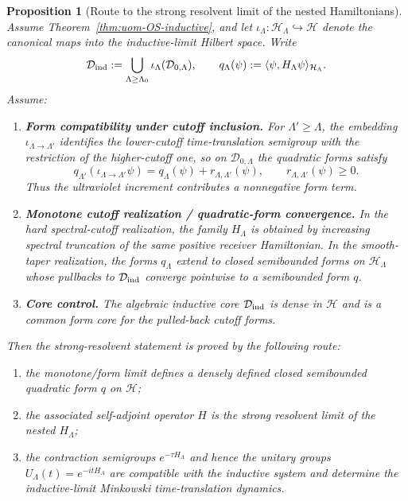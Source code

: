 \documentclass[10pt]{article}
\theoremstyle{definition}
\theoremstyle{plain}
\newtheorem{proposition}{Proposition}[section]
\begin{document}
\begin{proposition}[Route to the strong resolvent limit of the nested Hamiltonians]
\label{prop:uom-H-limit-route}
Assume Theorem~\ref{thm:uom-OS-inductive}, and let
\(
\iota_\Lambda:\mathcal H_\Lambda\hookrightarrow \mathcal H
\)
denote the canonical maps into the inductive-limit Hilbert space.  Write
\[
\mathcal D_{\rm ind}:=\bigcup_{\Lambda\ge\Lambda_0}\iota_\Lambda(\mathcal D_{0,\Lambda}),
\qquad
q_\Lambda(\psi):=\langle \psi,H_\Lambda\psi\rangle_{\mathcal H_\Lambda}.
\]
Assume:
\begin{enumerate}[label=\textnormal{(\roman*)},leftmargin=2.2em,itemsep=1pt]
\item \textbf{Form compatibility under cutoff inclusion.}
For $\Lambda'\ge \Lambda$, the embedding $\iota_{\Lambda\to\Lambda'}$ identifies the lower-cutoff time-translation semigroup with the restriction of the higher-cutoff one, so on $\mathcal D_{0,\Lambda}$ the quadratic forms satisfy
\[
q_{\Lambda'}(\iota_{\Lambda\to\Lambda'}\psi)
=
q_\Lambda(\psi)+r_{\Lambda,\Lambda'}(\psi),
\qquad
r_{\Lambda,\Lambda'}(\psi)\ge 0.
\]
Thus the ultraviolet increment contributes a nonnegative form term.
\item \textbf{Monotone cutoff realization / quadratic-form convergence.}
In the hard spectral-cutoff realization, the family $H_\Lambda$ is obtained by increasing spectral truncation of the same positive receiver Hamiltonian.  In the smooth-taper realization, the forms $q_\Lambda$ extend to closed semibounded forms on $\mathcal H_\Lambda$ whose pullbacks to $\mathcal D_{\rm ind}$ converge pointwise to a semibounded form $q$.
\item \textbf{Core control.}
The algebraic inductive core $\mathcal D_{\rm ind}$ is dense in $\mathcal H$ and is a common form core for the pulled-back cutoff forms.
\end{enumerate}
Then the strong-resolvent statement is proved by the following route:
\begin{enumerate}[label=\textnormal{(H\arabic*)},leftmargin=2.4em,itemsep=1pt]
\item the monotone/form limit defines a densely defined closed semibounded quadratic form $q$ on $\mathcal H$;
\item the associated self-adjoint operator $H$ is the strong resolvent limit of the nested $H_\Lambda$;
\item the contraction semigroups $e^{-\tau H_\Lambda}$ and hence the unitary groups $U_\Lambda(t)=e^{-itH_\Lambda}$ are compatible with the inductive system and determine the inductive-limit Minkowski time-translation dynamics.
\end{enumerate}
\end{proposition}
\end{document}
